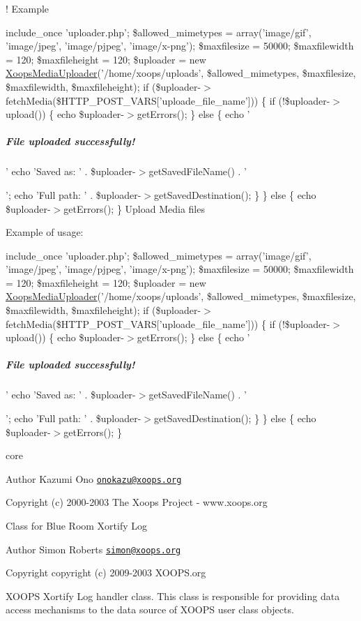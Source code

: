 ! Example

include\-\_\-once 'uploader.\-php'; \$allowed\-\_\-mimetypes = array('image/gif', 'image/jpeg', 'image/pjpeg', 'image/x-\/png'); \$maxfilesize = 50000; \$maxfilewidth = 120; \$maxfileheight = 120; \$uploader = new \hyperlink{class_xoops_media_uploader}{Xoops\-Media\-Uploader}('/home/xoops/uploads', \$allowed\-\_\-mimetypes, \$maxfilesize, \$maxfilewidth, \$maxfileheight); if (\$uploader-\/$>$fetch\-Media(\$\-H\-T\-T\-P\-\_\-\-P\-O\-S\-T\-\_\-\-V\-A\-R\-S\mbox{[}'uploade\-\_\-file\-\_\-name'\mbox{]})) \{ if (!\$uploader-\/$>$upload()) \{ echo \$uploader-\/$>$get\-Errors(); \} else \{ echo '\subparagraph*{File uploaded successfully!}

' echo 'Saved as\-: ' . \$uploader-\/$>$get\-Saved\-File\-Name() . '\par
'; echo 'Full path\-: ' . \$uploader-\/$>$get\-Saved\-Destination(); \} \} else \{ echo \$uploader-\/$>$get\-Errors(); \} Upload Media files

Example of usage\-: {\ttfamily  include\-\_\-once 'uploader.\-php'; \$allowed\-\_\-mimetypes = array('image/gif', 'image/jpeg', 'image/pjpeg', 'image/x-\/png'); \$maxfilesize = 50000; \$maxfilewidth = 120; \$maxfileheight = 120; \$uploader = new \hyperlink{class_xoops_media_uploader}{Xoops\-Media\-Uploader}('/home/xoops/uploads', \$allowed\-\_\-mimetypes, \$maxfilesize, \$maxfilewidth, \$maxfileheight); if (\$uploader-\/$>$fetch\-Media(\$\-H\-T\-T\-P\-\_\-\-P\-O\-S\-T\-\_\-\-V\-A\-R\-S\mbox{[}'uploade\-\_\-file\-\_\-name'\mbox{]})) \{ if (!\$uploader-\/$>$upload()) \{ echo \$uploader-\/$>$get\-Errors(); \} else \{ echo '\subparagraph*{File uploaded successfully!}}

{\ttfamily ' echo 'Saved as\-: ' . \$uploader-\/$>$get\-Saved\-File\-Name() . '\par
'; echo 'Full path\-: ' . \$uploader-\/$>$get\-Saved\-Destination(); \} \} else \{ echo \$uploader-\/$>$get\-Errors(); \} }

core \begin{DoxyAuthor}{Author}
Kazumi Ono \href{mailto:onokazu@xoops.org}{\tt onokazu@xoops.\-org} 
\end{DoxyAuthor}
\begin{DoxyCopyright}{Copyright}
(c) 2000-\/2003 The Xoops Project -\/ www.\-xoops.\-org
\end{DoxyCopyright}
Class for Blue Room Xortify Log \begin{DoxyAuthor}{Author}
Simon Roberts \href{mailto:simon@xoops.org}{\tt simon@xoops.\-org} 
\end{DoxyAuthor}
\begin{DoxyCopyright}{Copyright}
copyright (c) 2009-\/2003 X\-O\-O\-P\-S.\-org
\end{DoxyCopyright}
X\-O\-O\-P\-S Xortify Log handler class. This class is responsible for providing data access mechanisms to the data source of X\-O\-O\-P\-S user class objects.

